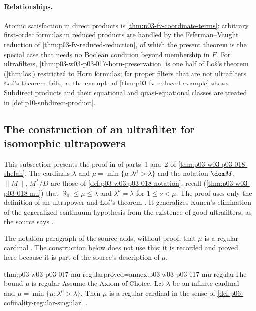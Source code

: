 \paragraph{Relationships.}  Atomic satisfaction in direct products is
\cref{thm:p03-fv-coordinate-terms}; arbitrary first-order formulas in
reduced products are handled by the Feferman--Vaught reduction of
\cref{thm:p03-fv-reduced-reduction}, of which the present theorem is the
special case that needs no Boolean condition beyond membership in \(F\).
For ultrafilters, \cref{thm:p03-w03-p03-017-horn-preservation} is one half
of \L o\'s's theorem (\cref{thm:los}) restricted to Horn formulas; for proper
filters that are not ultrafilters \L o\'s's theorem fails, as the example of
\cref{thm:p03-fv-reduced-example} shows.  Subdirect products and their
equational and quasi-equational classes are treated in
\cref{def:p10-subdirect-product}.

\subsection{The construction of an ultrafilter for isomorphic ultrapowers}
\label{sec:p03-w03-p03-017-shelah}

This subsection presents the proof in
\textcite{Shelah1971Ultrapowers} of parts~1 and~2 of
\cref{thm:p03-w03-p03-018-shelah}.  The cardinals \(\lambda\) and
\(\mu=\min\{\mu:\lambda^\mu>\lambda\}\) and the notation \(\dom M\),
\(\lVert M\rVert\), \(M^\lambda/D\) are those of
\cref{def:p03-w03-p03-018-notation}; recall
(\cref{thm:p03-w03-p03-018-mu}) that \(\aleph_0\le\mu\le\lambda\) and
\(\lambda^\nu=\lambda\) for \(1\le\nu<\mu\).  The proof uses only the
definition of an ultrapower and \L o\'s's theorem
\cite[p.~225]{Shelah1971Ultrapowers}.  It generalizes Kunen's elimination of
the generalized continuum hypothesis from the existence of good
ultrafilters, as the source says \cite[pp.~224--225]{Shelah1971Ultrapowers}.

The notation paragraph of the source adds, without proof, that \(\mu\) is a
regular cardinal \cite[p.~225]{Shelah1971Ultrapowers}.  The construction
below does not use this; it is recorded and proved here because it is part
of the source's description of \(\mu\).

\begin{hblemma}{thm:p03-w03-p03-017-mu-regular}{proved=annex:p03-w03-p03-017-mu-regular}{The bound \(\mu\) is regular}
Assume the Axiom of Choice.  Let \(\lambda\) be an infinite cardinal and
\(\mu=\min\{\mu:\lambda^\mu>\lambda\}\).  Then \(\mu\) is a regular cardinal
in the sense of \cref{def:p06-cofinality-regular-singular}
\cite[p.~225]{Shelah1971Ultrapowers}.
\end{hblemma}

